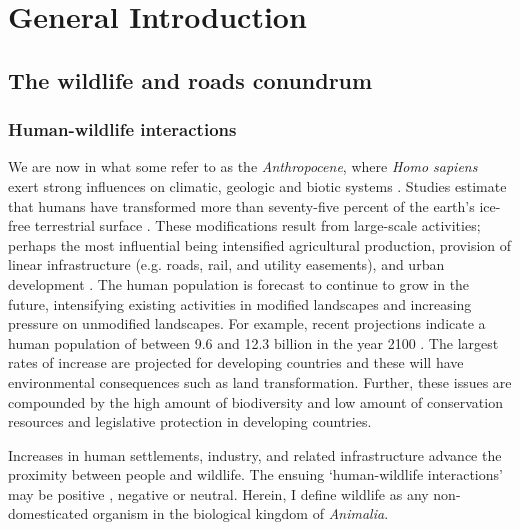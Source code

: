 \chapter{General Introduction}\label{sec:intro}
\newpage

\section{The wildlife and roads conundrum}

\subsection{Human-wildlife interactions}

We are now in what some refer to as the \textit{Anthropocene}, where \textit{Homo sapiens} exert strong influences on climatic, geologic and biotic systems \citep{crut06}. Studies estimate that humans have transformed more than seventy-five percent of the earth's ice-free terrestrial surface \citep[e.g.][]{elli08}. These modifications result from large-scale activities; perhaps the most influential being intensified agricultural production, provision of linear infrastructure (e.g. roads, rail, and utility easements), and urban development \citep{vito97,sand02,fole05}. The human population is forecast to continue to grow in the future, intensifying existing activities in modified landscapes and increasing pressure on unmodified landscapes. For example, recent projections indicate a human population of between 9.6 and 12.3 billion in the year 2100 \citep{gerl14}. The largest rates of increase are projected for developing countries and these will have environmental consequences such as land transformation. Further, these issues are compounded by the high amount of biodiversity and low amount of conservation resources and legislative protection in developing countries. 

Increases in human settlements, industry, and related infrastructure advance the proximity between people and wildlife. The ensuing `human-wildlife interactions' \citep[see][]{manf08} may be positive \citep[e.g. psychological well-being, see][]{dall12}, negative \citep[e.g. swooping birds, see][]{jone99} or neutral. Herein, I define wildlife as any non-domesticated organism in the biological kingdom of \textit{Animalia}. 

